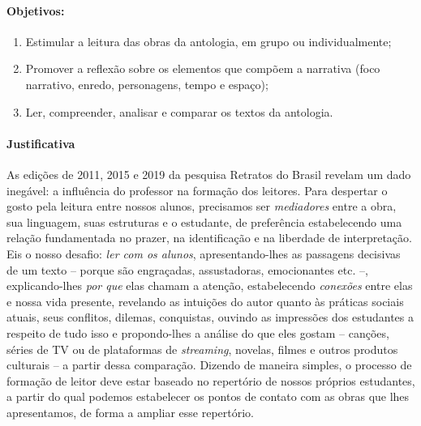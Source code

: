 \documentclass[11pt]{extarticle}
\begin{document}
\paragraph{Objetivos:} 
\begin{enumerate}
\item
Estimular a leitura das obras da antologia, em grupo ou individualmente; 
\item
Promover a reflexão sobre os elementos que compõem a narrativa (foco narrativo, enredo, personagens, tempo e espaço);
\item
Ler, compreender, analisar e comparar os textos da antologia.
\end{enumerate}

\paragraph{Justificativa} As edições de 2011, 2015 e 2019 da pesquisa
Retratos do Brasil revelam um dado inegável: a influência do professor
na formação dos leitores. Para despertar o gosto pela leitura entre
nossos alunos, precisamos ser \emph{mediadores} entre a obra, sua
linguagem, suas estruturas e o estudante, de preferência estabelecendo
uma relação fundamentada no prazer, na identificação e na liberdade de
interpretação. Eis o nosso desafio: \emph{ler com os alunos},
apresentando-lhes as passagens decisivas de um texto -- porque são
engraçadas, assustadoras, emocionantes etc. --, explicando-lhes
\emph{por que} elas chamam a atenção, estabelecendo \emph{conexões}
entre elas e nossa vida presente, revelando as intuições do autor quanto
às práticas sociais atuais, seus conflitos, dilemas, conquistas, ouvindo
as impressões dos estudantes a respeito de tudo isso e propondo-lhes a
análise do que eles gostam -- canções, séries de TV ou de plataformas de
\emph{streaming}, novelas, filmes e outros produtos culturais -- a
partir dessa comparação. Dizendo de maneira simples, o processo de
formação de leitor deve estar baseado no repertório de nossos próprios
estudantes, a partir do qual podemos estabelecer os pontos de contato
com as obras que lhes apresentamos, de forma a ampliar esse repertório.
\end{document}
